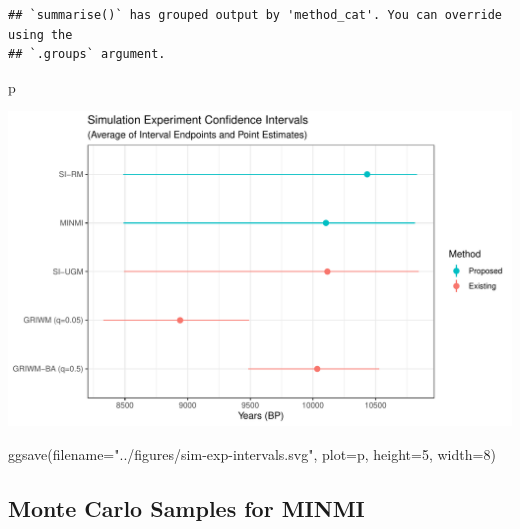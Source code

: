 \documentclass[
]{article}
\newenvironment{Shaded}{\begin{snugshade}}{\end{snugshade}}
\newcommand{\AttributeTok}[1]{\textcolor[rgb]{0.77,0.63,0.00}{#1}}
\newcommand{\DecValTok}[1]{\textcolor[rgb]{0.00,0.00,0.81}{#1}}
\newcommand{\FunctionTok}[1]{\textcolor[rgb]{0.00,0.00,0.00}{#1}}
\newcommand{\NormalTok}[1]{#1}
\newcommand{\StringTok}[1]{\textcolor[rgb]{0.31,0.60,0.02}{#1}}
\begin{document}
\begin{verbatim}
## `summarise()` has grouped output by 'method_cat'. You can override using the
## `.groups` argument.
\end{verbatim}

\begin{Shaded}
\begin{Highlighting}[]
\NormalTok{p}
\end{Highlighting}
\end{Shaded}

\includegraphics{sim_exp-results_files/figure-latex/unnamed-chunk-12-1.pdf}

\begin{Shaded}
\begin{Highlighting}[]
\FunctionTok{ggsave}\NormalTok{(}\AttributeTok{filename=}\StringTok{"../figures/sim{-}exp{-}intervals.svg"}\NormalTok{, }\AttributeTok{plot=}\NormalTok{p, }\AttributeTok{height=}\DecValTok{5}\NormalTok{, }\AttributeTok{width=}\DecValTok{8}\NormalTok{)}
\end{Highlighting}
\end{Shaded}

\hypertarget{monte-carlo-samples-for-minmi}{%
\subsection{Monte Carlo Samples for
MINMI}\label{monte-carlo-samples-for-minmi}}
\end{document}
